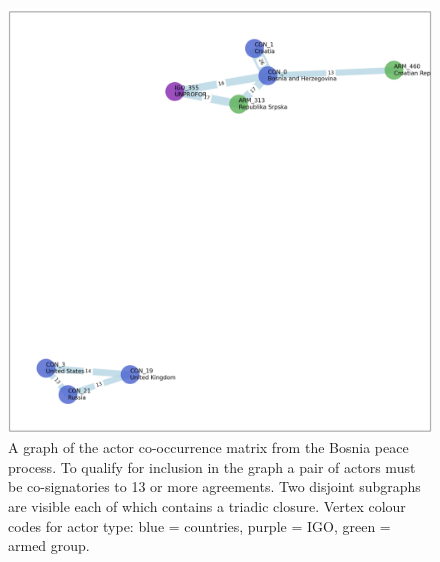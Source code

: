 \documentclass{article}
\begin{document}
\begin{figure}[H]
\begin{center}
\includegraphics[scale=0.50]{./assets/bosnia_actors.png}
\end{center}
\caption{A graph of the actor co-occurrence matrix from the Bosnia peace process. To qualify for inclusion in the graph a pair of actors must be co-signatories to 13 or more agreements. Two disjoint subgraphs are visible each of which contains a triadic closure. Vertex colour codes for actor type: blue = countries,  purple = IGO, green = armed group.}
\end{figure}
\end{document}
